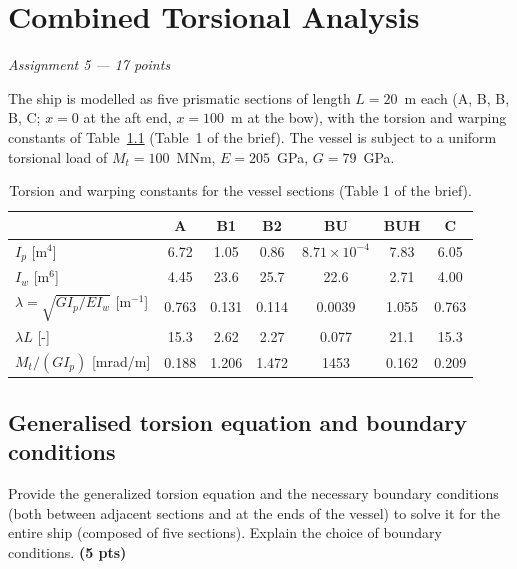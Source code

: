 \chapter{Combined Torsional Analysis}
\label{ch:assignment5}

\begingroup\itshape Assignment 5 --- 17 points\endgroup

\bigskip
The ship is modelled as five prismatic sections of length $L=20$~m each (A, B, B, B, C; $x=0$ at the aft end, $x=100$~m at the bow), with the torsion and warping constants of Table~\ref{tab:torsion-constants} (Table~1 of the brief). The vessel is subject to a uniform torsional load of $M_t=100$~MNm, $E=205$~GPa, $G=79$~GPa.

\begin{table}[htb]
  \centering
  \caption{Torsion and warping constants for the vessel sections (Table 1 of the brief).}
  \label{tab:torsion-constants}
  \begin{tabular}{lcccccc}
    \toprule
     & A & B1 & B2 & BU & BUH & C \\
    \midrule
    $I_p$ [m$^4$] & 6.72 & 1.05 & 0.86 & $8.71\times10^{-4}$ & 7.83 & 6.05 \\
    $I_w$ [m$^6$] & 4.45 & 23.6 & 25.7 & 22.6 & 2.71 & 4.00 \\
    $\lambda=\sqrt{GI_p/EI_w}$ [m$^{-1}$] & 0.763 & 0.131 & 0.114 & 0.0039 & 1.055 & 0.763 \\
    $\lambda L$ [-] & 15.3 & 2.62 & 2.27 & 0.077 & 21.1 & 15.3 \\
    $M_t/(GI_p)$ [mrad/m] & 0.188 & 1.206 & 1.472 & 1453 & 0.162 & 0.209 \\
    \bottomrule
  \end{tabular}
\end{table}

\section{Generalised torsion equation and boundary conditions}

Provide the generalized torsion equation and the necessary boundary conditions (both between adjacent sections and at the ends of the vessel) to solve it for the entire ship (composed of five sections). Explain the choice of boundary conditions. \textbf{(5 pts)}

